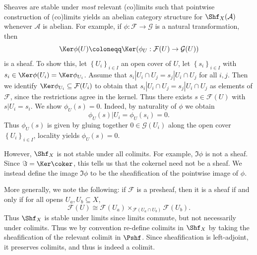 \begin{remark}\label{4.1.3}
	Sheaves are stable under \emph{most} relevant (co)limits such that pointwise construction of (co)limits yields an abelian category structure for $\Shf _X(\mathcal{A} )$ whenever $\mathcal{A} $ is abelian. For example, if $\phi : \mathcal{F}  \to \mathcal{G} $ is a natural transformation, then
	\[
		\Ker \phi (U) \coloneqq \Ker (\phi_U : \mathcal{F} (U) \to \mathcal{G} (U))
	\]
	is a sheaf. To show this, let $\left\{ U_i \right\} _{i\in I} $ an open cover of $U$, let $\left\{ s_i \right\}_{i\in I}$ with $s_i\in \Ker \phi(U_i)=\Ker \phi _{U_i} $. Assume that $s_i|U_i \cap U_j = s_j|U_i \cap U_j$ for all $i,j$. Then we identify $\Ker \phi _{U_i} \subseteq \mathcal{F} (U_i)$ to obtain that $s_i|U_i \cap U_j = s_j|U_i \cap U_j$ as elements of $\mathcal{F} $, since the restrictions agree in the kernel. Thus there exists $s\in \mathcal{F} (U)$ with $s|U_i=s_i$. We show $\phi _U(s)=0$. Indeed, by naturality of $\phi $ we obtain
	\[
		\phi _U(s)|U_i = \phi _U(s_i) = 0
	.\]
	Thus $\phi _U(s)$ is given by gluing together $0\in \mathcal{G} (U_i)$ along the open cover $\left\{ U_i \right\} _{i\in I} $, locality yields $\phi _U(s)=0$.

	However, $\Shf _X$ is not stable under all colimits. For example, $\Im \phi $ is not a sheaf. Since $\Im = \Ker \coker $, this tells us that the cokernel need not be a sheaf. We instead define the image $\Im \phi $ to be the sheafification of the pointwise image of $\phi $.

	More generally, we note the following: if $\mathcal{F} $ is a presheaf, then it is a sheaf if and only if for all opens $U_a,U_b\subseteq X$,
	\[
		\mathcal{F} (U) \cong \mathcal{F} (U_a)\times_{\mathcal{F} (U_a \cap U_b)} \mathcal{F} (U_b)
	.\]
	Thus $\Shf _X$ is stable under limits since limits commute, but not necessarily under colimits. Thus we by convention re-define colimits in $\Shf _X$ by taking the sheafification of the relevant colimit in $\Pshf $. Since sheafification is left-adjoint, it preserves colimits, and thus is indeed a colimit.
\end{remark}

